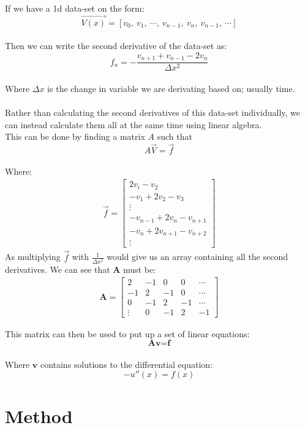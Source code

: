 \documentclass[a4paper,12pt,norsk]{article}
\begin{document}
	If we have a 1d data-set on the form:
	$$\vec{V(x)} = [v_0,\ v_1,\ \cdots,\ v_{n-1},\ v_{n},\ v_{n-1},\ \cdots] $$\\
	Then we can write the second derivative of the data-set as:
	$$f_n = -\frac{v_{n+1} + v_{n-1} - 2v_n}{\Delta x^2} $$\\
	Where $\Delta x$ is the change in variable we are derivating based on; usually time.\\
	\\
	Rather than calculating the second derivatives of this data-set individually, we can instead calculate them all at the same time using linear algebra.\\
	This can be done by finding a matrix $A$ such that
	$$A\vec{V} = \vec{f} $$\\
	Where:
	\begin{gather*}
	\vec{f} = \left[
	\begin{array}{c}
	2v_i - v_2\\
	-v_1 + 2v_2 - v_3\\
	\vdots\\
	-v_{n-1} + 2v_n -v_{n+1}\\
	-v_n + 2v_{n+1} - v_{n+2}\\
	\vdots
	\end{array}
	\right]
	\end{gather*}
	As multiplying $\vec{f}$ with $\frac{1}{\Delta x^2}$ would give us an array containing all the second derivatives. We can see that $\textbf{A}$ must be:
	\begin{gather*}
	\textbf{A} = \left[
	\begin{array}{ccccc}
	2 & -1 & 0 & 0 & \cdots\\
	-1 & 2 & -1 & 0 & \cdots\\
	0 & -1 & 2 & -1 & \cdots\\
	\vdots & 0 & -1 & 2 & -1
	\end{array}
	\right]
	\end{gather*}

	This matrix can then be used to put up a set of linear equations:
	$$\textbf{A}\textbf{v} = \textbf{f} $$\\
	Where $\textbf{v}$ contains solutions to the differential equation:
	$$-u''(x) = f(x) $$
	
\section{Method}
\end{document}
